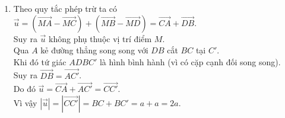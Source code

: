 \begin{bt}
{\begin{enumerate}
{}
			\item Theo quy tắc phép trừ ta có\\
			$\overrightarrow u=\left(\overrightarrow{MA}-\overrightarrow{MC}\right)+\left(\overrightarrow{MB}-\overrightarrow{MD}\right)=\overrightarrow{CA}+\overrightarrow{DB}$.\\
			Suy ra $\overrightarrow u $ không phụ thuộc vị trí điểm $M$.\\
			Qua $A$ kẻ đường thẳng song song với $DB$ cắt $BC$ tại $C'$.\\
			Khi đó tứ giác $ADBC'$ là hình bình hành (vì có cặp cạnh đối song song).\\
			Suy ra $\overrightarrow{DB}=\overrightarrow{AC'}$.\\
			Do đó $\overrightarrow u=\overrightarrow{CA}+\overrightarrow{AC'}=\overrightarrow{CC'}$.\\
			Vì vậy $\left|\overrightarrow u\right|=\left|\overrightarrow{CC'}\right|=BC+BC'=a+a=2a$.
		\end{enumerate}
	}
\end{bt}

